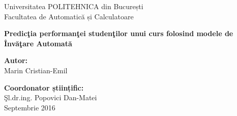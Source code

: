 \thispagestyle{empty}
\begin{center}
\large
Universitatea POLITEHNICA din București \\
Facultatea de Automatică și Calculatoare \\

{\LARGE
	\textbf{Predicţia performanţei studenţilor unui curs folosind modele de Învăţare Automată}
}

\vspace{3cm}
\textbf{Autor:}\\
Marin Cristian-Emil

\bigskip
\bigskip

\textbf{Coordonator științific:}\\
Şl.dr.ing. Popovici Dan-Matei\\

Septembrie 2016 \\
\vspace*{1cm}
\end{center}
